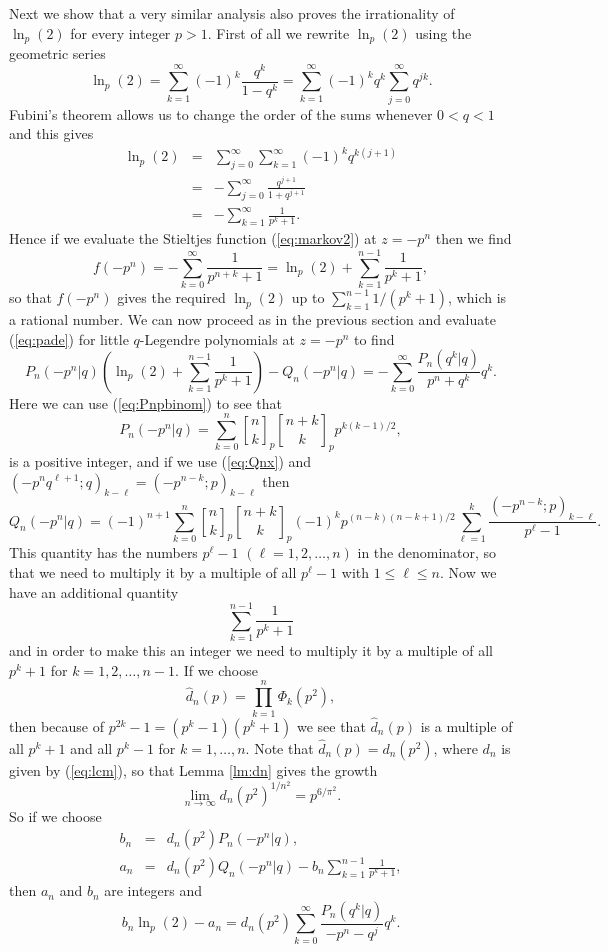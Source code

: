\documentclass[12pt]{article}
\DeclareRobustCommand{\qbinom}{\genfrac[]{0pt}{}}
\begin{document}
Next we show that a very similar analysis also proves the irrationality of
$\ln_p(2)$ for every integer $p > 1$. First of all we rewrite
$\ln_p(2)$ using the geometric series
\[  \ln_p(2) = \sum_{k=1}^\infty (-1)^k \frac{q^k}{1-q^k} 
             = \sum_{k=1}^\infty (-1)^k q^k \sum_{j=0}^\infty q^{jk}. \]
Fubini's theorem allows us to change the order of the sums whenever
$0 < q < 1$ and this gives
\begin{eqnarray*}
  \ln_p(2) & = & \sum_{j=0}^\infty \sum_{k=1}^\infty (-1)^k q^{k(j+1)}  \\
        & = & - \sum_{j=0}^\infty \frac{q^{j+1}}{1+q^{j+1}} \\
        & = & - \sum_{k=1}^\infty \frac{1}{p^k+1}.
\end{eqnarray*}
Hence if we evaluate the Stieltjes function (\ref{eq:markov2}) at
$z=-p^n$ then we find
\[   f(-p^n) = - \sum_{k=0}^\infty \frac{1}{p^{n+k}+1}
             = \ln_p(2) + \sum_{k=1}^{n-1} \frac{1}{p^k+1}, \]
so that $f(-p^n)$ gives the required $\ln_p(2)$ up to
$\sum_{k=1}^{n-1} 1/(p^k+1)$, which is a rational number.
We can now proceed as in the previous section and evaluate
(\ref{eq:pade}) for little $q$-Legendre polynomials at $z=-p^n$
to find
\[   P_n(-p^n|q) \left( \ln_p(2) + \sum_{k=1}^{n-1} \frac{1}{p^k+1}
  \right) - Q_n(-p^n|q) = - \sum_{k=0}^\infty 
  \frac{P_n(q^k|q)}{p^n+q^k} q^k. \]             
Here we can use (\ref{eq:Pnpbinom}) to see that
\[    P_n(-p^n|q) = \sum_{k=0}^n \qbinom{n}{k}_p \qbinom{n+k}{k}_p
   p^{k(k-1)/2}, \]
is a positive integer, and if we use (\ref{eq:Qnx}) and
$(-p^nq^{\ell+1};q)_{k-\ell} =(-p^{n-k};p)_{k-\ell}$ then 
\[  Q_n(-p^n|q) = 
    (-1)^{n+1} \sum_{k=0}^n \qbinom{n}{k}_p \qbinom{n+k}{k}_p (-1)^k
                  p^{(n-k)(n-k+1)/2} \sum_{\ell=1}^{k} \frac{(-p^{n-k};p)_{k-\ell}}{p^\ell-1} . \]
This quantity has the numbers $p^\ell-1$ $(\ell=1,2,\ldots,n)$ in the denominator,
so that we need to multiply it by a multiple of all $p^\ell-1$ with $1 \leq \ell \leq n$.                                
Now we have an additional quantity
\[  \sum_{k=1}^{n-1} \frac{1}{p^k+1}  \]
and in order to make this an integer we need to multiply
it by a multiple of all $p^k+1$ for $k=1,2,\ldots,n-1$. If we choose
\[   \hat{d}_n(p) = \prod_{k=1}^n \Phi_k(p^2), \]
then because of $p^{2k}-1=(p^k-1)(p^k+1)$ we see that $\hat{d}_n(p)$
is a multiple of all $p^k+1$ and all $p^k-1$ for $k=1,\ldots,n$. Note
that $\hat{d}_n(p) = d_n(p^2)$, where $d_n$ is given by (\ref{eq:lcm}), so
that Lemma \ref{lm:dn} gives the growth
\begin{equation}   \label{eq:d2n}
   \lim_{n \to \infty} d_n(p^2)^{1/n^2} = p^{6/\pi^2}. 
\end{equation}
So if we choose
\begin{eqnarray}            
           b_n & = & d_n(p^2) P_n(-p^n|q), 
\label{eq:bnl} \\
           a_n & = & d_n(p^2) Q_n(-p^n|q) -
            b_n \sum_{k=1}^{n-1} \frac{1}{p^k+1}, \label{eq:anl}
\end{eqnarray}             
then $a_n$ and $b_n$ are integers and
\begin{equation}  \label{eq:errorl}
   b_n \ln_p(2) - a_n = d_n(p^2) \sum_{k=0}^\infty 
   \frac{P_n(q^k|q)}{-p^n-q^j} q^k .
\end{equation} 
\end{document}
